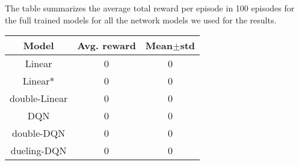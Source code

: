\documentclass{article}
\begin{document}

The table summarizes the average total reward per episode in 100 episodes for the full trained models for all the network models we used for the results.
\begin{center}
 \begin{tabular}{||c | c c||} 
 \hline
 Model & Avg. reward & Mean$\pm$std \\ [0.5ex] 
 \hline\hline
 Linear & 0 & 0 \\ 
 \hline
 Linear* & 0 & 0 \\
 \hline
 double-Linear & 0 & 0 \\
 \hline
 DQN & 0 & 0 \\
 \hline
 double-DQN & 0 & 0 \\  
 \hline
 dueling-DQN & 0 & 0 \\ 
 \hline
\end{tabular}
\end{center}
\end{document}
